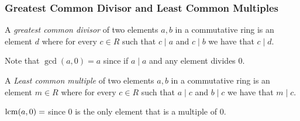 \subsubsection{Greatest Common Divisor and Least Common Multiples}
\begin{definition}
    A \textit{greatest common divisor} of two elements $a,b$ in a commutative ring is an element $d$ where for every $c\in R$ such that $c\mid a$ and $c\mid b$ we have that $c\mid d$. 
\end{definition}
\begin{remark}
    Note that $\gcd(a,0)=a$ since if $a\mid a$ and any element divides $0$.
\end{remark}
\begin{definition}
    A \textit{Least common multiple} of two elements $a,b$ in a commutative ring is an element $m\in R$ where for every $c\in R$ such that $a\mid c$ and $b\mid c$ we have that $m\mid c$.
\end{definition}
\begin{remark}
    $\mathrm{lcm}(a,0)=$ since $0$ is the only element that is a multiple of $0$.
\end{remark}
